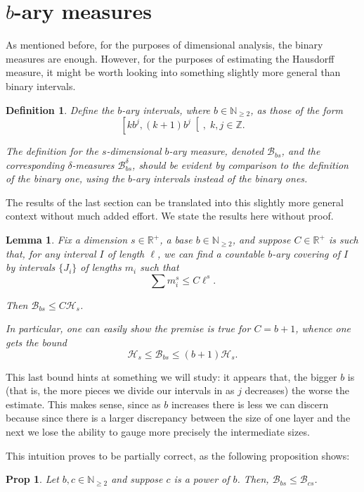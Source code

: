 \documentclass[11pt, reqno]{amsart}
\newcommand{\R}{\mathbb{R}}
\newcommand{\Z}{\mathbb{Z}}
\newcommand{\N}{\mathbb{N}}
\newcommand{\HH}{\mathcal{H}}
\newcommand{\BB}{\mathcal{B}}
\newtheorem{lemma}{Lemma}
\newtheorem{prop}{Prop}
\newtheorem{definition}{Definition}
\begin{document}
\section{$b$-ary measures}\label{sectgenbmeasures}

As mentioned before, for the purposes of dimensional analysis, the binary measures are enough. However, for the purposes of estimating the Hausdorff measure, it might be worth looking into something slightly more general than binary intervals.

\begin{definition}
Define the $b$-ary intervals, where $b \in \N_{\geq 2}$, as those of the form
\[\left[k b^j, (k+1) b^j \right[, \;k, j \in \Z.\]

The definition for the $s$-dimensional $b$-ary measure, denoted $\BB_{bs}$, and the corresponding $\delta$-measures $\BB_{bs}^\delta$, should be evident by comparison to the definition of the binary one, using the $b$-ary intervals instead of the binary ones.
\end{definition}

The results of the last section can be translated into this slightly more general context without much added effort. We state the results here without proof.

\begin{lemma}
Fix a dimension $s \in \R^+$, a base $b \in \N_{\geq 2}$, and suppose $C \in \R^+$ is such that, for any interval $I$ of length $\ell$, we can find a countable $b$-ary covering of $I$ by intervals $\{J_i\}$ of lengths $m_i$ such that
\[\sum m_i^s \leq C \ell^s.\]

Then $\BB_{bs} \leq C \HH_s$.

In particular, one can easily show the premise is true for $C = b+1$, whence one gets the bound
\[\HH_s \leq \BB_{bs} \leq (b+1) \HH_s.\]
\end{lemma}

This last bound hints at something we will study: it appears that, the bigger $b$ is (that is, the more pieces we divide our intervals in as $j$ decreases) the worse the estimate. This makes sense, since as $b$ increases there is less we can discern because since there is a larger discrepancy between the size of one layer and the next we lose the ability to gauge more precisely the intermediate sizes.

This intuition proves to be partially correct, as the following proposition shows:

\begin{prop}
Let $b, c \in \N_{\geq 2}$ and suppose $c$ is a power of $b$. Then, $\BB_{bs} \leq \BB_{cs}$.
\end{prop}
\end{document}
